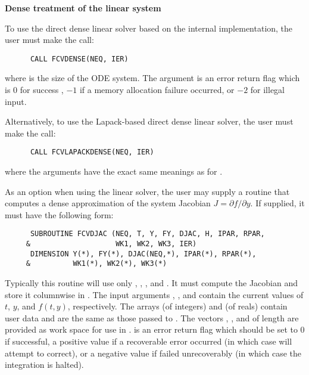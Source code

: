 \begin{Steps}

  {\s} {\bf Dense treatment of the linear system}
  
  To use the direct dense linear solver based on the internal {\cvode}
  implementation, the user must make the call:
\begin{verbatim}
      CALL FCVDENSE(NEQ, IER)
\end{verbatim}
  where  is the size of the ODE system.
  The argument  is an error return flag which is $0$ for success , 
  $-1$ if a memory allocation failure occurred, or $-2$ for illegal input.

  Alternatively, to use the Lapack-based direct dense linear solver, 
  the user must make the call:
\begin{verbatim}
      CALL FCVLAPACKDENSE(NEQ, IER)
\end{verbatim}
  where the arguments have the exact same meanings as for .

  As an option when using the {\dense} linear solver, the user may supply a
  routine that computes a dense approximation of the system Jacobian 
  $J = \partial f / \partial y$. If supplied, it must have the following form:
\begin{verbatim}
      SUBROUTINE FCVDJAC (NEQ, T, Y, FY, DJAC, H, IPAR, RPAR,
     &                    WK1, WK2, WK3, IER)
      DIMENSION Y(*), FY(*), DJAC(NEQ,*), IPAR(*), RPAR(*),
     &          WK1(*), WK2(*), WK3(*)
\end{verbatim}
  Typically this routine will use only , , , and . 
  It must compute the Jacobian and store it columnwise in .
  The input arguments , , and  contain the current
  values of $t$, $y$, and $f(t,y)$, respectively.
  The arrays  (of integers) and  (of reals) contain user data
  and are the same as those passed to .
  The vectors , , and 
  of length  are provided as work space for use in .
   is an error return flag which should be set to $0$ if successful, 
  a positive value if a recoverable error occurred (in which case {\cvode} will 
  attempt to correct), or a negative value if  failed unrecoverably 
  (in which case the integration is halted).


\end{Steps}
